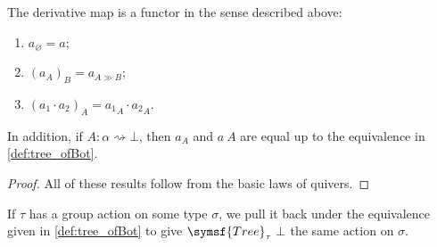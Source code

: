 \begin{lemma}
    \label{lem:derivative_functor}
    The derivative map is a functor in the sense described above:
    \begin{enumerate}
        \item \( a_\varnothing = a \);
        \item \( (a_A)_B = a_{A \gg B} \);
        \item \( (a_1 \cdot a_2)_A = {a_1}_A \cdot {a_2}_A \).
    \end{enumerate}
    In addition, if \( A : \alpha \rightsquigarrow \bot \), then \( a_A \) and \( a\ A \) are equal up to the equivalence in \cref{def:tree_ofBot}.
\end{lemma}
\begin{proof}
    All of these results follow from the basic laws of quivers.
\end{proof}
\begin{definition}
    If \( \tau \) has a group action on some type \( \sigma \), we pull it back under the equivalence given in \cref{def:tree_ofBot} to give \( \symsf{Tree}_\tau\ \bot \) the same action on \( \sigma \).
\end{definition}
